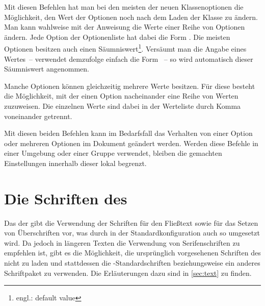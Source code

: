 \begin{Declaration}{}
\begin{Declaration}{}
\printdeclarationlist%
%
%
Mit diesen Befehlen hat man bei den meisten der neuen Klassenoptionen die 
Möglichkeit, den Wert der Optionen noch nach dem Laden der Klasse zu ändern.
Man kann wahlweise mit der Anweisung  die Werte einer Reihe 
von Optionen ändern. Jede Option der Optionenliste hat dabei die Form
\PValue{=}. Die meisten Optionen besitzen auch einen 
Säumniswert\footnote{engl.: default value}. Versäumt man die Angabe eines 
Wertes~-- verwendet demzufolge einfach die Form ~-- so wird 
automatisch dieser Säumniswert angenommen.

Manche Optionen können gleichzeitig mehrere Werte besitzen. Für diese besteht 
die Möglichkeit, mit  der einen Option nacheinander eine 
Reihe von Werten zuzuweisen. Die einzelnen Werte sind dabei in der Werteliste 
durch Komma voneinander getrennt.

Mit diesen beiden Befehlen kann im Bedarfsfall das Verhalten von einer Option 
oder mehreren Optionen im Dokument geändert werden. Werden diese Befehle in 
einer Umgebung oder einer Gruppe verwendet, bleiben die gemachten Einstellungen 
innerhalb dieser lokal begrenzt.
\end{Declaration}
\end{Declaration}



\section{Die Schriften des \CDs}
\label{sec:fonts}
%
Das \CD der \TnUD gibt die Verwendung der Schriften \Univers für den Fließtext 
sowie \DIN für das Setzen von Überschriften vor, was durch \TUDScript in der 
Standardkonfiguration auch so umgesetzt wird. Da jedoch in längeren Texten die 
Verwendung von Serifenschriften zu empfehlen ist, gibt es die Möglichkeit, die 
ursprünglich vorgesehenen Schriften des \CDs nicht zu laden und stattdessen die 
-Standardschriften beziehungsweise ein anderes Schriftpaket zu 
verwenden. Die Erläuterungen dazu sind in \autoref{sec:text} zu finden.

